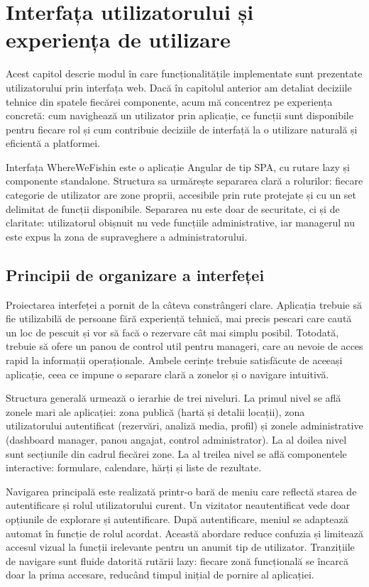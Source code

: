 ﻿\chapter{Interfața utilizatorului și experiența de utilizare}

Acest capitol descrie modul în care funcționalitățile implementate sunt prezentate utilizatorului prin interfața web. Dacă în capitolul anterior am detaliat deciziile tehnice din spatele fiecărei componente, acum mă concentrez pe experiența concretă: cum navighează un utilizator prin aplicație, ce funcții sunt disponibile pentru fiecare rol și cum contribuie deciziile de interfață la o utilizare naturală și eficientă a platformei.

Interfața WhereWeFishin este o aplicație Angular de tip SPA, cu rutare lazy și componente standalone. Structura sa urmărește separarea clară a rolurilor: fiecare categorie de utilizator are zone proprii, accesibile prin rute protejate și cu un set delimitat de funcții disponibile. Separarea nu este doar de securitate, ci și de claritate: utilizatorul obișnuit nu vede funcțiile administrative, iar managerul nu este expus la zona de supraveghere a administratorului.

\section{Principii de organizare a interfeței}

Proiectarea interfeței a pornit de la câteva constrângeri clare. Aplicația trebuie să fie utilizabilă de persoane fără experiență tehnică, mai precis pescari care caută un loc de pescuit și vor să facă o rezervare cât mai simplu posibil. Totodată, trebuie să ofere un panou de control util pentru manageri, care au nevoie de acces rapid la informații operaționale. Ambele cerințe trebuie satisfăcute de aceeași aplicație, ceea ce impune o separare clară a zonelor și o navigare intuitivă.

Structura generală urmează o ierarhie de trei niveluri. La primul nivel se află zonele mari ale aplicației: zona publică (hartă și detalii locații), zona utilizatorului autentificat (rezervări, analiză media, profil) și zonele administrative (dashboard manager, panou angajat, control administrator). La al doilea nivel sunt secțiunile din cadrul fiecărei zone. La al treilea nivel se află componentele interactive: formulare, calendare, hărți și liste de rezultate.

Navigarea principală este realizată printr-o bară de meniu care reflectă starea de autentificare și rolul utilizatorului curent. Un vizitator neautentificat vede doar opțiunile de explorare și autentificare. După autentificare, meniul se adaptează automat în funcție de rolul acordat. Această abordare reduce confuzia și limitează accesul vizual la funcții irelevante pentru un anumit tip de utilizator. Tranzițiile de navigare sunt fluide datorită rutării lazy: fiecare zonă funcțională se încarcă doar la prima accesare, reducând timpul inițial de pornire al aplicației.


